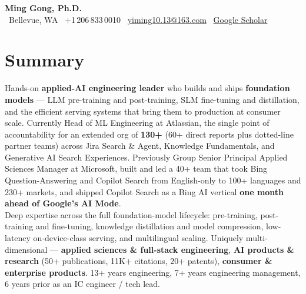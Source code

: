 \documentclass[10.5pt,letterpaper]{article}
\begin{document}
\begin{center}
  {\LARGE\bfseries\color{blue!60!black} Ming Gong, Ph.D.}\\[3pt]
  \faMapMarker* \ Bellevue, WA \quad \textbar \quad
  \faPhone \ +1\,206\,833\,0010 \quad \textbar \quad
  \faEnvelope \ \href{mailto:yiming10.13@163.com}{yiming10.13@163.com} \quad \textbar \quad
  \faGraduationCap \ \href{https://scholar.google.com/citations?user=c7JEFwsAAAAJ}{Google Scholar}
\end{center}

\section*{Summary}
Hands-on \textbf{applied-AI engineering leader} who builds and ships \textbf{foundation models} --- LLM pre-training and post-training, SLM fine-tuning and distillation, and the efficient serving systems that bring them to production at consumer scale. Currently Head of ML Engineering at Atlassian, the single point of accountability for an extended org of \textbf{130+} (60+ direct reports plus dotted-line partner teams) across Jira Search \& Agent, Knowledge Fundamentals, and Generative AI Search Experiences. Previously Group Senior Principal Applied Sciences Manager at Microsoft, built and led a 40+ team that took Bing Question-Answering and Copilot Search from English-only to 100+ languages and 230+ markets, and shipped Copilot Search as a Bing AI vertical \textbf{one month ahead of Google's AI Mode}.\\[4pt]
Deep expertise across the full foundation-model lifecycle: pre-training, post-training and fine-tuning, knowledge distillation and model compression, low-latency on-device-class serving, and multilingual scaling. Uniquely multi-dimensional --- \textbf{applied sciences \& full-stack engineering}, \textbf{AI products \& research} (50+ publications, 11K+ citations, 20+ patents), \textbf{consumer \& enterprise products}. 13+ years engineering, 7+ years engineering management, 6 years prior as an IC engineer / tech lead.

\end{document}
